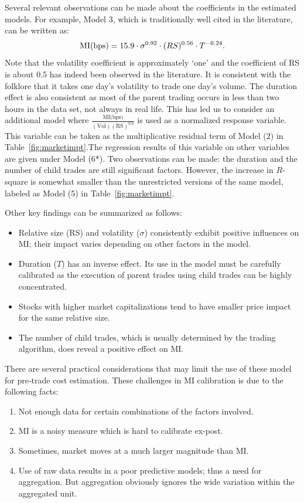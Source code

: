 Several relevant observations can be made about the coefficients in the estimated models. For example, Model 3, which is traditionally well cited in the literature, can be written as:
	\[
	\text{MI(\text{bps})}= 15.9\cdot\sigma^{0.92}\cdot(RS)^{0.56}\cdot T^{-0.24}.
	\]
Note that the volatility coefficient is approximately `one' and the coefficient of RS is about 0.5 has indeed been observed in the literature. It is consistent with the folklore that it takes one day's volatility to trade one day's volume. The duration effect is also consistent as most of the parent trading occurs in less than two hours in the data set, not always in real life. This has led us to consider an additional model where $\frac{\text{MI(bps)}}{(\text{Vol})(\text{RS})^{0.6}}$ is used as a normalized response variable. This variable can be taken as the multiplicative residual term of  Model (2) in Table~\ref{fig:marketimpt}.The regression results of this variable on other variables are given under Model (6*). Two observations can be made: the duration and the number of child trades are still significant factors. However, the increase in $R$-square is somewhat smaller than the unrestricted versions of the same model, labeled as Model (5) in Table~\ref{fig:marketimpt}.


Other key findings can be summarized as follows:
        \begin{itemize}
        \item Relative size (RS) and volatility ($\sigma$) consistently exhibit positive influences on MI; their impact varies depending on other factors in the model.
        \item Duration ($T$) has an inverse effect. Its use in the model must be carefully calibrated as the execution of parent trades using child trades can be highly concentrated.
        \item Stocks with higher market capitalizations tend to have smaller price impact for the same relative size.
        \item The number of child trades, which is usually determined by the trading algorithm, does reveal a positive effect on MI.
        \end{itemize}
There are several practical considerations that may limit the use of these model for pre-trade cost estimation. These challenges in MI calibration is due to the following facts:
	\begin{enumerate}[--]
	\item Not enough data for certain combinations of the factors involved.
	\item MI is a noisy measure which is hard to calibrate ex-post.
	\item Sometimes, market moves at a much larger magnitude than MI.
	\item Use of raw data results in a poor predictive models; thus a need for aggregation. But aggregation obviously ignores the wide variation within the aggregated unit. 
	\end{enumerate}